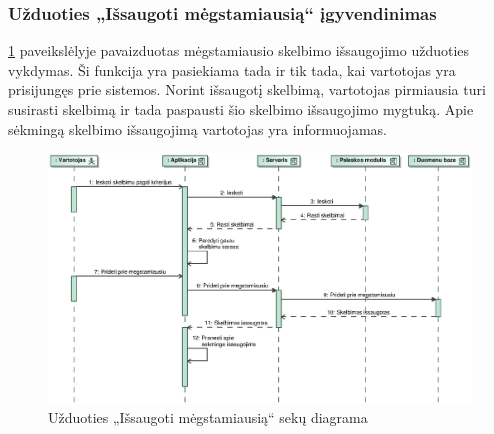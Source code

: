 \documentclass[12pt]{article}
\begin{document}
	\subsubsection{Užduoties „Išsaugoti mėgstamiausią“ įgyvendinimas}
	\ref{SaveFavSeq} paveikslėlyje pavaizduotas mėgstamiausio skelbimo išsaugojimo užduoties vykdymas. Ši funkcija yra pasiekiama tada ir tik tada, kai vartotojas yra prisijungęs prie sistemos. Norint išsaugotį skelbimą, vartotojas pirmiausia turi susirasti skelbimą ir tada  paspausti šio skelbimo išsaugojimo mygtuką. Apie sėkmingą skelbimo išsaugojimą vartotojas yra informuojamas.
	\begin{figure}[h]
		\begin{center}
			\includegraphics[width=\textwidth]{IssaugotiMegstamiausia.eps}
			\caption{Užduoties „Išsaugoti mėgstamiausią“ sekų diagrama\label{SaveFavSeq}}
		\end{center}
	\end{figure}
	
	
	\pagebreak
	
\end{document}
